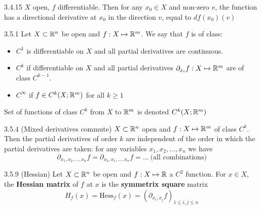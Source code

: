 \begin{proposition}{3.4.15}
    $X$ open, $f$ differentiable. Then for any $x_0 \in X$ and non-zero $v$, the function has
    a directional derivative at $x_0$ in the direction $v$, equal to $df(x_0)(v)$
\end{proposition}

\begin{definition}{3.5.1}
    Let $X \subset \mathbb{R}^n$ be open and $f: X \mapsto \mathbb{R}^m$.
    We say that $f$ is of class:
    \begin{itemize}
        \item $C^1$ is differentiable on $X$ and all partial derivatives are continuous.
        \item $C^k$ if differentiable on $X$ and all partial derivatives $\partial_{x_i}f: X \mapsto \mathbb{R}^m$ are of class $C^{k-1}$.
        \item $C^\infty$ if $f \in C^k(X;\mathbb{R}^m)$ for all $k \ge 1$
    \end{itemize}
    Set of functions of class $C^k$ from $X$ to $\mathbb{R}^m$ is denoted $C^k(X; \mathbb{R}^m)$
\end{definition}

\begin{proposition}{3.5.4 (Mixed derivatives commute)}
    $X \subset \mathbb{R}^n$ open and $f: X \mapsto \mathbb{R}^m$ of class $C^k$. Then the partial derivatives
    of order $k$ are independent of the order in which the partial derivatives are taken: for any variables
    $x_1, x_2, ..., x_n$ we have
    \[ \partial_{x_1, x_2, ..., x_n}f = \partial_{x_2, x_1, ..., x_n}f = ...   \ \mbox{(all combinations)}\]
\end{proposition}

\begin{definition}{3.5.9 (Hessian)}
    Let $X \subset \mathbb{R}^n$ be open and $f: X \mapsto \mathbb{R}$ a $C^2$ function.
    For $x \in X$, the \textbf{Hessian matrix} of $f$ at $x$ is the \textbf{symmetrix square} matrix
    \[ \mathit{H}_f(x) = \mathrm{Hess}_f(x) = (\partial_{x_i, x_j}f)_{1 \le i, j \le n} \]
\end{definition}

